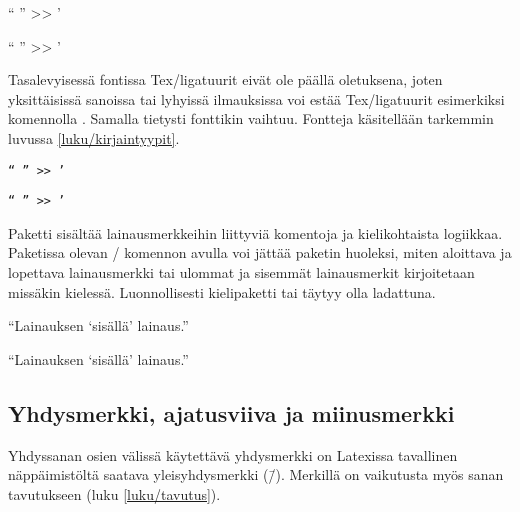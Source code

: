 \begin{koodilohkosis}
{ `` '' >> '}
\end{koodilohkosis}

\begin{tulossis}
  { `` '' >> '}
\end{tulossis}

\noindent
Tasalevyisessä fontissa Tex\-/ligatuurit eivät ole päällä oletuksena,
joten yksittäisissä sanoissa tai lyhyissä ilmauksissa voi estää
Tex\-/ligatuurit esimerkiksi komennolla . Samalla
tietysti fonttikin vaihtuu. Fontteja käsitellään tarkemmin luvussa
\ref{luku/kirjaintyypit}.

\begin{koodilohkosis}
\texttt{`` '' >> '}
\end{koodilohkosis}

\begin{tulossis}
  \texttt{`` '' >> '}
\end{tulossis}

\noindent
Paketti  sisältää
lainausmerkkeihin liittyviä komentoja ja kielikohtaista logiikkaa.
Paketissa olevan \-/ komennon avulla voi jättää
paketin huoleksi, miten aloittava ja lopettava lainausmerkki tai
ulommat ja sisemmät lainausmerkit kirjoitetaan missäkin kielessä.
Luonnollisesti kielipaketti  tai 
täytyy olla ladattuna.

\begin{koodilohkosis}
\usepackage{polyglossia} \setdefaultlanguage{finnish}
\usepackage[autostyle=true]{csquotes}
\enquote{Lainauksen \enquote{sisällä} lainaus.}
\end{koodilohkosis}

\begin{tulossis}
  \enquote{Lainauksen \enquote{sisällä} lainaus.}
\end{tulossis}

\subsection{Yhdysmerkki, ajatusviiva ja miinusmerkki}
\label{luku/yhdys-ajatus-miinus}

Yhdyssanan osien välissä käytettävä yhdysmerkki on Latexissa tavallinen
näppäimistöltä saatava yleisyhdysmerkki (\=/). Merkillä on vaikutusta
myös sanan tavutukseen (luku \ref{luku/tavutus}).

